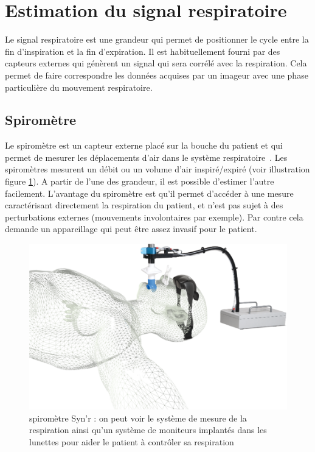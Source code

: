 \section{Estimation du signal respiratoire}

Le signal respiratoire est une grandeur qui permet de positionner le cycle entre la fin d'inspiration et la fin d'expiration. Il est habituellement fourni par des capteurs externes qui génèrent un signal qui sera corrélé avec la respiration. Cela permet de faire correspondre les données acquises par un imageur avec une phase particulière du mouvement respiratoire.

\subsection{Spiromètre}

Le spiromètre est un capteur externe placé sur la bouche du patient et qui permet de mesurer les déplacements d'air dans le système respiratoire~\cite{guivarc2004synchronization}. Les spiromètres mesurent un débit ou un volume d'air inspiré/expiré (voir illustration figure \ref{fig:spirometre}). A partir de l'une des grandeur, il est possible d'estimer l'autre facilement. L'avantage du spiromètre est qu'il permet d'accéder à une mesure caractérisant directement la respiration du patient, et n'est pas sujet à des perturbations externes (mouvements involontaires par exemple). Par contre cela demande un appareillage qui peut être assez invasif pour le patient.

\begin{figure}[h!]
	\begin{center}
		\includegraphics[width=12cm]{images/spiro}
	\end{center}
	\caption{spiromètre Syn'r : on peut voir le système de mesure de la respiration ainsi qu'un système de moniteurs implantés dans les lunettes pour aider le patient à contrôler sa respiration} 
	\label{fig:spirometre}
\end{figure}

